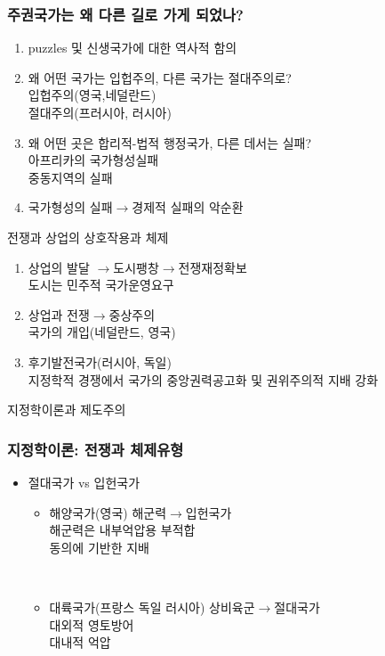 \documentclass[xcolor=pdftex,dvipsnames]{beamer}
\renewcommand{\(}{\left(}
\renewcommand{\)}{\right)}
\begin{document}
\begin{frame}
\frametitle{주권국가는 왜 다른 길로 가게 되었나?}
\begin{enumerate}
\item puzzles 및 신생국가에 대한 역사적 함의
\item 왜 어떤 국가는 입헙주의, 다른 국가는 절대주의로?\\
입헙주의(영국,네덜란드)\\
절대주의(프러시아, 러시아)
\item 왜 어떤 곳은 합리적-법적 행정국가, 다른 데서는 실패?\\
아프리카의 국가형성실패\\
중동지역의 실패\\
\item 국가형성의 실패$\rightarrow$경제적 실패의 악순환
\end{enumerate}
\end{frame}


\begin{frame}{전쟁과 상업의 상호작용과 체제}
\begin{enumerate}
\item 상업의 발달 $\rightarrow$도시팽창$\rightarrow$전쟁재정확보\\
도시는 민주적 국가운영요구
\item 상업과 전쟁$\rightarrow$중상주의 \\
국가의 개입(네덜란드, 영국)\\
\item 후기발전국가(러시아, 독일)\\
지정학적 경쟁에서 국가의 중앙권력공고화 및 권위주의적 지배 강화
\end{enumerate}

\end{frame}

\begin{frame}{지정학이론과 제도주의}
\frametitle{지정학이론: 전쟁과 체제유형}
\begin{itemize}
\item 절대국가 vs 입헌국가
\begin{itemize}
\item 해양국가(영국) 해군력$\rightarrow$입헌국가\\
해군력은 내부억압용 부적합 \\
동의에 기반한 지배

\

\item 대륙국가(프랑스 독일 러시아) 상비육군$\rightarrow$절대국가\\
대외적 영토방어\\
대내적 억압
\end{itemize}
\end{itemize}
\end{frame}
\end{document}

